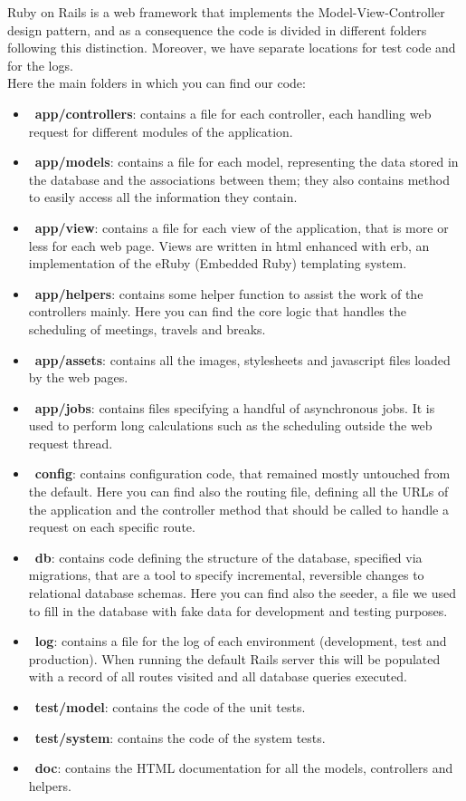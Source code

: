 Ruby on Rails is a web framework that implements the Model-View-Controller design pattern, and as a consequence the code is divided in different folders following this distinction. Moreover, we have separate locations for test code and for the logs. \\
Here the main folders in which you can find our code:

\begin{itemize}
\item~\textbf{app/controllers}: contains a file for each controller, each handling web request for different modules of the application.
\item~\textbf{app/models}: contains a file for each model, representing the data stored in the database and the associations between them; they also contains method to easily access all the information they contain.
\item~\textbf{app/view}: contains a file for each view of the application, that is more or less for each web page. Views are written in html enhanced with erb, an implementation of the eRuby (Embedded Ruby) templating system.
\item~\textbf{app/helpers}: contains some helper function to assist the work of the controllers mainly. Here you can find the core logic that handles the scheduling of meetings, travels and breaks. 
\item~\textbf{app/assets}: contains all the images, stylesheets and javascript files loaded by the web pages.
\item~\textbf{app/jobs}: contains files specifying a handful of asynchronous jobs. It is used to perform long calculations such as the scheduling outside the web request thread.
\item~\textbf{config}: contains configuration code, that remained mostly untouched from the default. Here you can find also the routing file, defining all the URLs of the application and the controller method that should be called to handle a request on each specific route.
\item~\textbf{db}: contains code defining the structure of the database, specified via migrations, that are a tool to specify incremental, reversible changes to relational database schemas. Here you can find also the seeder, a file we used to fill in the database with fake data for development and testing purposes.
\item~\textbf{log}: contains a file for the log of each environment (development, test and production). When running the default Rails server this will be populated with a record of all routes visited and all database queries executed.
\item~\textbf{test/model}: contains the code of the unit tests.
\item~\textbf{test/system}: contains the code of the system tests.
\item~\textbf{doc}: contains the HTML documentation for all the models, controllers and helpers.
\end{itemize}